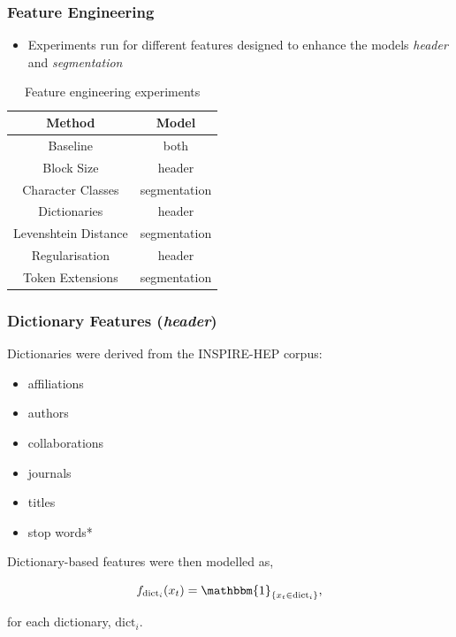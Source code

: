 \documentclass{beamer}
\begin{document}
\begin{frame}
\frametitle{Feature Engineering}

\begin{itemize}
\item Experiments run for different features designed to enhance the models \emph{header} and \emph{segmentation}
\end{itemize}

\begin{table}[h]
\begin{center}
\begin{tabular}{|c|c|}
\hline
Method & Model \\
\hline
Baseline & both \\
\hline
Block Size & {header} \\
\hline
Character Classes & {segmentation} \\
\hline
Dictionaries & {header} \\
\hline
Levenshtein Distance & {segmentation} \\
\hline
Regularisation & {header} \\
\hline
Token Extensions & {segmentation} \\
\hline
\end{tabular}
\caption[]{Feature engineering experiments}
\end{center}
\end{table}
\end{frame}


\begin{frame}
\frametitle{Dictionary Features (\emph{header})}

Dictionaries were derived from the INSPIRE-HEP corpus:

\begin{itemize}
\item affiliations
\item authors
\item collaborations
\item journals
\item titles
\item stop words*
\end{itemize}

Dictionary-based features were then modelled as,

$$
f_{\text{dict}_i}(x_t) = \mathbbm{1}_{\{x_t \in \text{dict}_i\}},
$$

for each dictionary, $\text{dict}_i$.

\end{frame}
\end{document}
